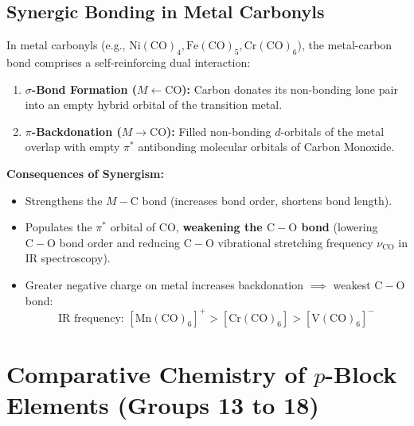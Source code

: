 \documentclass[10pt,a4paper]{article}
\begin{document}
\subsection{Synergic Bonding in Metal Carbonyls}
\begin{conceptbox}
In metal carbonyls (e.g., $\mathrm{Ni(CO)_4, Fe(CO)_5, Cr(CO)_6}$), the metal-carbon bond comprises a self-reinforcing dual interaction:
\begin{enumerate}
  \item \textbf{$\sigma$-Bond Formation ($M \leftarrow \mathrm{CO}$):} Carbon donates its non-bonding lone pair into an empty hybrid orbital of the transition metal.
  \item \textbf{$\pi$-Backdonation ($M \to \mathrm{CO}$):} Filled non-bonding $d$-orbitals of the metal overlap with empty $\pi^*$ antibonding molecular orbitals of Carbon Monoxide.
\end{enumerate}
\textbf{Consequences of Synergism:}
\begin{itemize}
  \item Strengthens the $M-\mathrm{C}$ bond (increases bond order, shortens bond length).
  \item Populates the $\pi^*$ orbital of $\mathrm{CO}$, \textbf{weakening the $\mathrm{C-O}$ bond} (lowering $\mathrm{C-O}$ bond order and reducing $\mathrm{C-O}$ vibrational stretching frequency $\nu_{\mathrm{CO}}$ in IR spectroscopy).
  \item Greater negative charge on metal increases backdonation $\implies$ weakest $\mathrm{C-O}$ bond:
  \begin{equation}
    \text{IR frequency: } \mathrm{[Mn(CO)_6]^+ > [Cr(CO)_6] > [V(CO)_6]^-}
  \end{equation}
\end{itemize}
\end{conceptbox}

\section{Comparative Chemistry of $p$-Block Elements (Groups 13 to 18)}
\end{document}
